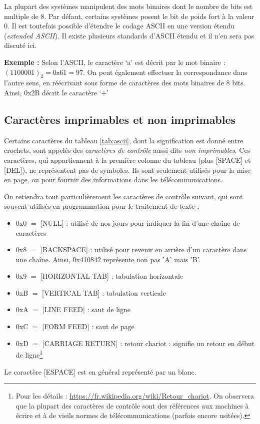 \documentclass[../../main.tex]{subfiles}
\begin{document}
La plupart des systèmes manipulent des mots binaires dont le nombre de bits est multiple de $8$. Par défaut, certains systèmes posent le bit de poids fort à la valeur 0. Il est toutefois possible d'étendre le codage ASCII en une version étendu (\textit{extended ASCII}). Il existe plusieurs standards d'ASCII étendu et il n'en sera pas discuté ici.
 
\textbf{Exemple :} Selon l'ASCII, le caractère `a' est décrit par le mot binaire : $(1100001)_{2} = 0\textsf{x}61 = 97$. On peut également effectuer la correspondance dans l'autre sens, en réécrivant sous forme de caractères des mots binaires de 8 bits. Ainsi, \textsf{0x2B} décrit le caractère `$+$'
\subsection{Caractères imprimables et non imprimables} \label{sub:caract_res_imprimables_et_non_imprimables}
Certains caractères du tableau \ref{tab:ascii}, dont la signification est donné entre crochets, sont appelés des \textit{caractères de contrôle} aussi dits \textit{non imprimables}. Ces caractères, qui appartiennent à la première colonne du tableau (plus \textsf{[SPACE]} et \textsf{[DEL]}), ne représentent pas de symboles. Ils sont seulement utilisés pour la mise en page, ou pour fournir des informations dans les télécommunications.

On retiendra tout particulièrement les caractères de contrôle suivant, qui sont souvent utilisés en programmation pour le traitement de texte :
\begin{itemize}
  \item \textsf{0x0 $=$ [NULL]} : utilisé de nos jours pour indiquer la fin d'une chaîne de caractères
  \item \textsf{0x8 $=$ [BACKSPACE]} : utilisé pour revenir en arrière d'un caractère dans une chaîne. Ainsi, \textsf{0x410842} représente non pas 'A' mais 'B'.
  \item \textsf{0x9 $=$ [HORIZONTAL TAB]} : tabulation horizontale
  \item \textsf{0xB $=$ [VERTICAL TAB]} : tabulation verticale
  \item \textsf{0xA $=$ [LINE FEED]} : saut de ligne
  \item \textsf{0xC $=$ [FORM FEED]} : saut de page
  \item \textsf{0xD $=$ [CARRIAGE RETURN]} : retour chariot : signifie un retour en début de ligne\footnote{Pour les détails : \url{https://fr.wikipedia.org/wiki/Retour_chariot}. On observera que la plupart des caractères de contrôle sont des références aux machines à écrire et à de vieils normes de télécommunications (parfois encore usitées).}
\end{itemize}
Le caractère \textsf{[ESPACE]} est en général représenté par un blanc.
\end{document}
